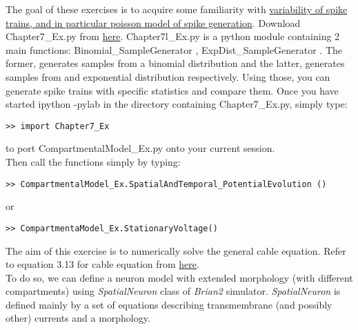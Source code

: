 \documentclass[a4paper,10pt]{Exercises}
\begin{document}
\newcommand{\erf}{\textrm{erf}}


The goal of these exercises is to acquire some familiarity with \href{http://neuronaldynamics.epfl.ch/online/Ch7.S2.html}{variability of spike trains, and  in particular poisson model of spike generation}.
Download Chapter7\_Ex.py  from  \href{http://neuronaldynamics.epfl.ch/lectures.html}{here}.  Chapter7l\_Ex.py is a python module containing 2 main functions:  Binomial\_SampleGenerator , ExpDist\_SampleGenerator . The former, generates samples from a binomial distribution and the latter, generates samples from and exponential distribution respectively. Using those, you can generate spike trains with specific statistics and compare them. Once you have started ipython -pylab in the directory containing Chapter7\_Ex.py, simply type:
\begin{verbatim}
>> import Chapter7_Ex
\end{verbatim}
to port CompartmentalModel\_Ex.py onto your current session.  \\ Then call the functions simply by typing:
\begin{verbatim}
>> CompartmentalModel_Ex.SpatialAndTemporal_PotentialEvolution ()
\end{verbatim}
or
\begin{verbatim}
>> CompartmentaModel_Ex.StationaryVoltage()
\end{verbatim}
\Exercise[]
The aim of this exercise is to numerically solve the general cable equation. Refer to equation 3.13 for cable equation from \href{http://neuronaldynamics.epfl.ch/online/Ch3.S2.html} {here}.\\
To do so, we can define a neuron model with extended morphology (with different compartments) using \textit{SpatialNeuron} class of \textit{Brian2} simulator. \textit{SpatialNeuron} is defined mainly by a set of equations describing transmembrane (and possibly other) currents and a morphology. \\
\end{document}
